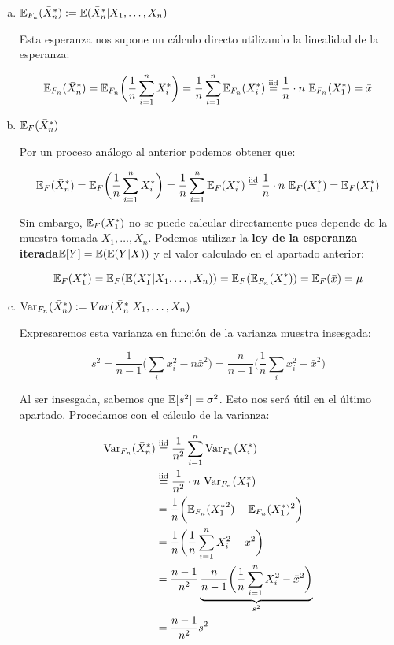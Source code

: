 \documentclass[a4paper]{article}
\begin{document}
\begin{enumerate}[a)]
	\item $\mathbb{E}_{F_n}(\bar X_n^*) := \mathbb{E}(\bar X_n^* | X_1, \ldots, X_n)$
	
	Esta esperanza nos supone un cálculo directo utilizando la linealidad de la esperanza:
	
	\[
		\E_{F_n}(\bar X_n^*) = \E_{F_n} \bigg( \frac{1}{n} \sum_{i=1}^n X_i^* \bigg) = \frac{1}{n} \sum_{i=1}^n \E_{F_n}(X_i^*) \stackrel{\text{iid}}{=} \frac{1}{n} \cdot n \ \E_{F_n}(X_1^*) = \bar x
	\]
	
	\item $\mathbb{E}_{F}(\bar X_n^*)$
	
	Por un proceso análogo al anterior podemos obtener que:
	
	\[
		\E_{F}(\bar X_n^*) = \E_{F} \bigg( \frac{1}{n} \sum_{i=1}^n X_i^* \bigg) = \frac{1}{n} \sum_{i=1}^n \E_{F}(X_i^*) \stackrel{\text{iid}}{=} \frac{1}{n} \cdot n \ \E_{F}(X_1^*) = \E_{F}(X_1^*)
	\]
	
	Sin embargo, $\mathbb{E}_{F}(X_1^*)$ no se puede calcular directamente pues depende de la muestra tomada $X_1, \ldots, X_n$. Podemos utilizar la \textbf{ley de la esperanza iterada}$\mathbb{E}[Y] = \mathbb{E}(\mathbb{E}(Y|X))$ y el valor calculado en el apartado anterior:
		
	\[
		\mathbb{E}_{F}(X_1^*) = \mathbb{E}_{F}(\mathbb{E}(X_1^* | X_1, \ldots, X_n)) = \mathbb{E}_{F}(\mathbb{E}_{F_n}(X_1^*)) = \mathbb{E}_{F}(\bar x) = \mu
	\]
	
	\item $\text{Var}_{F_n}(\bar X_n^*) := Var(\bar X_n^* | X_1, \ldots, X_n)$
	
	Expresaremos esta varianza en función de la varianza muestra insesgada:
	
	\[
		s^2 = \frac{1}{n-1} \bigg( \sum_i x_i^2 - n \bar x^2 \bigg) = \frac{n}{n-1} \bigg( \frac{1}{n}\sum_i x_i^2 - \bar x^2 \bigg)
	\]
	
	Al ser insesgada, sabemos que $\mathbb{E}[s^2] = \sigma^2$. Esto nos será útil en el último apartado. Procedamos con el cálculo de la varianza:
		
	\[
		\begin{split}
			\Var_{F_n}(\bar X_n^*) & \stackrel{\text{iid}}{=} \frac{1}{n^2} \sum_{i=1}^n \Var_{F_n}(X_i^*) \\
			& \stackrel{\text{iid}}{=} \frac{1}{n^2} \cdot n \ \Var_{F_n}(X_1^*) \\
			& = \frac{1}{n} \bigg( \E_{F_n}( {X_1^*}^2 ) - \E_{F_n}( X_1^* )^2 \bigg) \\
			& = \frac{1}{n} \bigg( \frac{1}{n} \sum_{i=1}^n X_i^2 - \bar x^2 \bigg) \\
			& = \frac{n-1}{n^2} \underbrace{\frac{n}{n-1} \bigg( \frac{1}{n} \sum_{i=1}^n X_i^2 - \bar x^2 \bigg)}_{s^2} \\
			& = \frac{n-1}{n^2} s^2 \\
		\end{split}
	\]
	

\end{enumerate}
\end{document}
